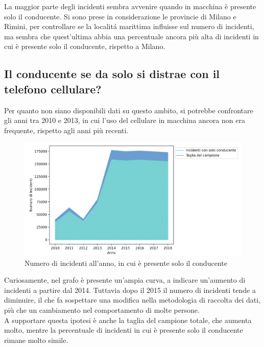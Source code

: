 \documentclass[a4paper]{report}
\begin{document}
La maggior parte degli incidenti sembra avvenire quando in macchina è presente solo il conducente.
Si sono prese in considerazione le provincie di Milano e Rimini, per controllare se la localit\'a 
marittima influisse sul numero di incidenti, ma sembra che quest'ultima abbia una percentuale 
ancora più alta di incidenti in cui è presente solo il conducente, rispetto a Milano.


\subsection{Il conducente se da solo si distrae con il telefono cellulare?}

Per quanto non siano disponibili dati su questo ambito, si potrebbe confrontare gli anni tra 2010 e 2013, 
in cui l'uso del cellulare in macchina ancora non era frequente, rispetto agli anni più recenti.

\begin{figure}
    \includegraphics[width=\linewidth]{../src/incidenti/incidenti_senza_coords/anno/incremento_incidenti.png}
    \caption{Numero di incidenti all'anno, in cui è presente solo il conducente}
    \label{fig:incremento_incidenti}
\end{figure}

Curiosamente, nel grafo è presente un'ampia curva, a indicare un'aumento di incidenti 
a partire dal 2014. Tuttavia dopo il 2015 il numero di incidenti tende a diminuire, il che 
fa sospettare una modifica nella metodologia di raccolta dei dati, più che un cambiamento 
nel comportamento di molte persone.\\
A supportare questa ipotesi è anche la taglia del campione totale, che aumenta molto, mentre la 
percentuale di incidenti in cui è presente solo il conducente rimane molto simile.
\end{document}

